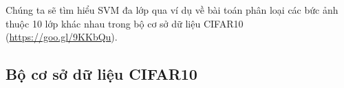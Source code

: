 




Chúng ta sẽ tìm hiểu SVM đa lớp qua ví dụ về bài toán phân loại các bức ảnh thuộc 10 lớp khác nhau trong bộ cơ sở dữ liệu CIFAR10 (\url{https://goo.gl/9KKbQu}).

\subsection{Bộ cơ sở dữ liệu CIFAR10}


